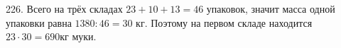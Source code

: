 226. Всего на трёх складах $23+10+13=46$ упаковок, значит масса одной упаковки равна $1380:46=30$ кг. Поэтому на первом складе находится $23\cdot30=690$кг муки.\\
